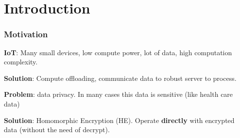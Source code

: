 \documentclass[10pt,handout]{beamer}
\begin{document}

\section{Introduction}

\begin{frame}
    \frametitle{Motivation}

        \textbf{IoT}: Many small devices, low compute power, lot of data, high computation complexity.
    \vspace{-0.3cm}

        \textbf{Solution}: Compute offloading, communicate data to robust server to process.
    \vspace{-0.3cm}

\pause
        \textbf{Problem}: data privacy. In many cases this data is sensitive (like health care data)
    \vspace{-0.3cm}


\pause
          \textbf{Solution}: Homomorphic Encryption (HE). Operate \textbf{directly} with encrypted data (without the need of decrypt).
          \pause
\begin{columns}
\end{columns}
\end{frame}
\end{document}
